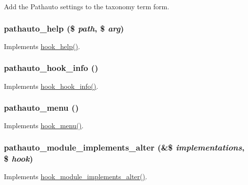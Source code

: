 Add the Pathauto settings to the taxonomy term form. \hypertarget{pathauto_8module_aa633ee0b08bc28c487cd4f3c21f7a001}{
\subsubsection[{pathauto\_\-help}]{\setlength{\rightskip}{0pt plus 5cm}pathauto\_\-help (\$ {\em path}, \/  \$ {\em arg})}}
\label{pathauto_8module_aa633ee0b08bc28c487cd4f3c21f7a001}
Implements \hyperlink{group__hooks_ga5589c2714a782738e8851c4c90231f0e}{hook\_\-help()}. \hypertarget{pathauto_8module_aec3433593badeba9c5f6d72c727c0850}{
\subsubsection[{pathauto\_\-hook\_\-info}]{\setlength{\rightskip}{0pt plus 5cm}pathauto\_\-hook\_\-info ()}}
\label{pathauto_8module_aec3433593badeba9c5f6d72c727c0850}
Implements \hyperlink{group__hooks_ga65142e7864f445483786087d180a2010}{hook\_\-hook\_\-info()}. \hypertarget{pathauto_8module_a32103de2e3a1451e5396ef6d7bb0b53e}{
\subsubsection[{pathauto\_\-menu}]{\setlength{\rightskip}{0pt plus 5cm}pathauto\_\-menu ()}}
\label{pathauto_8module_a32103de2e3a1451e5396ef6d7bb0b53e}
Implements \hyperlink{group__hooks_ga5c95244fea59b25666e409759e133ded}{hook\_\-menu()}. \hypertarget{pathauto_8module_aaf87f3ee5c92db465e39a83dafc7e470}{
\subsubsection[{pathauto\_\-module\_\-implements\_\-alter}]{\setlength{\rightskip}{0pt plus 5cm}pathauto\_\-module\_\-implements\_\-alter (\&\$ {\em implementations}, \/  \$ {\em hook})}}
\label{pathauto_8module_aaf87f3ee5c92db465e39a83dafc7e470}
Implements \hyperlink{group__hooks_gab71c322e6487a3b99bd04c5b9adb13f6}{hook\_\-module\_\-implements\_\-alter()}.

